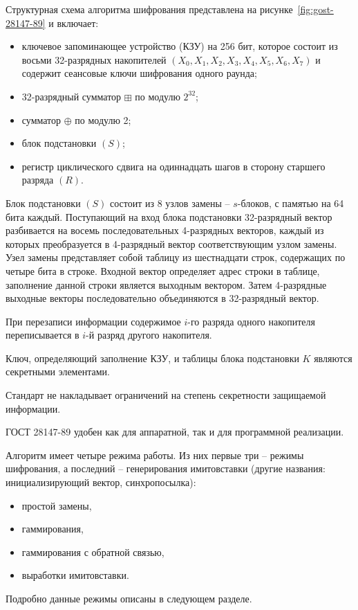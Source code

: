 Структурная схема алгоритма шифрования представлена на рисунке~\ref{fig:gost-28147-89} и включает:
\begin{itemize}
    \item ключевое запоминающее устройство (КЗУ) на 256 бит, которое состоит из восьми 32-разрядных накопителей $(X_0, X_1, X_2, X_3, X_4, X_5, X_6, X_7)$ и содержит сеансовые ключи шифрования одного раунда;
    \item 32-разрядный сумматор $\boxplus$ по модулю $2^{32}$;
    \item сумматор $\oplus$ по модулю 2;
    \item блок подстановки $(S)$;
    \item регистр циклического сдвига на одиннадцать шагов в сторону старшего разряда $(R)$.
\end{itemize}

Блок подстановки $(S)$ состоит из 8 узлов замены -- $s$-блоков, с памятью на 64 бита каждый. Поступающий на вход блока подстановки 32-разрядный вектор разбивается на восемь последовательных 4-разрядных векторов, каждый из которых преобразуется в 4-разрядный вектор соответствующим узлом замены. Узел замены представляет собой таблицу из шестнадцати строк, содержащих по четыре бита в строке. Входной вектор определяет адрес строки в таблице, заполнение данной строки является выходным вектором. Затем 4-разрядные выходные векторы последовательно объединяются в 32-разрядный вектор.

При перезаписи информации содержимое $i$-го разряда одного накопителя переписывается в $i$-й разряд другого накопителя.

Ключ, определяющий заполнение КЗУ, и таблицы блока подстановки $K$ являются секретными элементами.

Стандарт не накладывает ограничений на степень секретности защищаемой информации.

ГОСТ 28147-89 удобен как для аппаратной, так и для программной реализации.

Алгоритм имеет четыре режима работы. Из них первые три -- режимы шифрования, а последний -- генерирования имитовставки (другие названия: инициализирующий вектор, синхропосылка):
\begin{itemize}
    \item простой замены,
    \item гаммирования,
    \item гаммирования с обратной связью,
    \item выработки имитовставки.
\end{itemize}


Подробно данные режимы описаны в следующем разделе.

